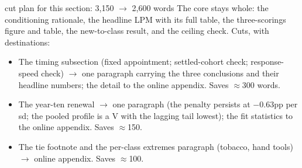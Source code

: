 \begin{ericbox}{cut plan for this section: 3,150 $\to$ 2,600 words}
The core stays whole: the conditioning rationale, the headline LPM with
its full table, the three-scorings figure and table, the new-to-class
result, and the ceiling check. Cuts, with destinations:
\begin{itemize}[nosep]
\item The timing subsection (fixed appointment; settled-cohort check;
response-speed check) $\to$ one paragraph carrying the three conclusions
and their headline numbers; the detail to the online appendix. Saves
$\approx$300 words.
\item The year-ten renewal $\to$ one paragraph (the penalty persists at
$-0.63$pp per sd; the pooled profile is a V with the lagging tail
lowest); the fit statistics to the online appendix. Saves $\approx$150.
\item The tie footnote and the per-class extremes paragraph (tobacco,
hand tools) $\to$ online appendix. Saves $\approx$100.
\end{itemize}
\end{ericbox}
